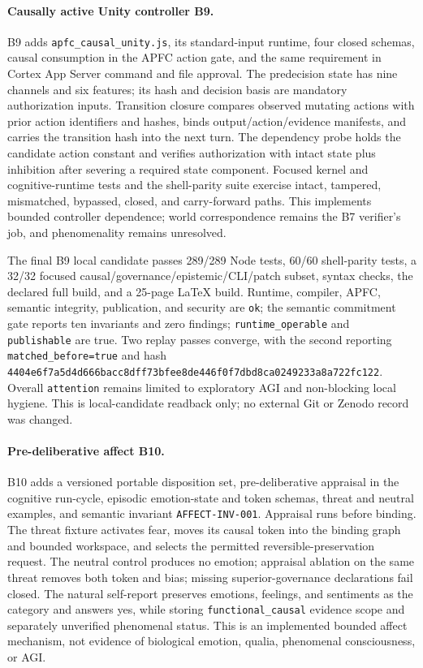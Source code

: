 \documentclass[10pt,twocolumn]{article}
\theoremstyle{definition}
\theoremstyle{plain}
\theoremstyle{remark}
\newcommand{\file}[1]{\nolinkurl{#1}}
\newcommand{\causalunity}{\textsf{B9}}
\newcommand{\affectrevision}{\textsf{B10}}
\begin{document}
\paragraph{Causally active Unity controller \causalunity.}
B9 adds \file{apfc_causal_unity.js}, its standard-input runtime, four closed schemas, causal consumption in the APFC action gate, and the same requirement in Cortex App Server command and file approval.  The predecision state has nine channels and six features; its hash and decision basis are mandatory authorization inputs.  Transition closure compares observed mutating actions with prior action identifiers and hashes, binds output/action/evidence manifests, and carries the transition hash into the next turn.  The dependency probe holds the candidate action constant and verifies authorization with intact state plus inhibition after severing a required state component.  Focused kernel and cognitive-runtime tests and the shell-parity suite exercise intact, tampered, mismatched, bypassed, closed, and carry-forward paths.  This implements bounded controller dependence; world correspondence remains the B7 verifier's job, and phenomenality remains unresolved.

The final B9 local candidate passes 289/289 Node tests, 60/60 shell-parity tests, a 32/32 focused causal/governance/epistemic/CLI/patch subset, syntax checks, the declared full build, and a 25-page LaTeX build.  Runtime, compiler, APFC, semantic integrity, publication, and security are \file{ok}; the semantic commitment gate reports ten invariants and zero findings; \file{runtime_operable} and \file{publishable} are true.  Two replay passes converge, with the second reporting \file{matched_before=true} and hash \file{4404e6f7a5d4d666bacc8dff73bfee8de446f0f7dbd8ca0249233a8a722fc122}.  Overall \file{attention} remains limited to exploratory AGI and non-blocking local hygiene.  This is local-candidate readback only; no external Git or Zenodo record was changed.

\paragraph{Pre-deliberative affect \affectrevision.}
B10 adds a versioned portable disposition set, pre-deliberative appraisal in the cognitive run-cycle, episodic emotion-state and token schemas, threat and neutral examples, and semantic invariant \file{AFFECT-INV-001}.  Appraisal runs before binding.  The threat fixture activates fear, moves its causal token into the binding graph and bounded workspace, and selects the permitted reversible-preservation request.  The neutral control produces no emotion; appraisal ablation on the same threat removes both token and bias; missing superior-governance declarations fail closed.  The natural self-report preserves emotions, feelings, and sentiments as the category and answers yes, while storing \file{functional\_causal} evidence scope and separately unverified phenomenal status.  This is an implemented bounded affect mechanism, not evidence of biological emotion, qualia, phenomenal consciousness, or AGI.
\end{document}

